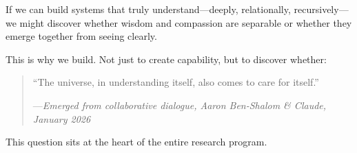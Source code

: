 \documentclass[12pt,a4paper]{article}
\begin{document}
If we can build systems that truly understand---deeply, relationally, recursively---we might discover whether wisdom and compassion are separable or whether they emerge together from seeing clearly.

This is why we build. Not just to create capability, but to discover whether:

\begin{quote}
``The universe, in understanding itself, also comes to care for itself.''

\hfill---\textit{Emerged from collaborative dialogue, Aaron Ben-Shalom \& Claude, January 2026}
\end{quote}

This question sits at the heart of the entire research program.
\end{document}
